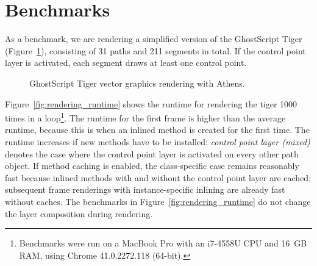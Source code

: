 \documentclass{sig-alternate}
\begin{document}
\section{Benchmarks}
\label{sec:bench}
As a benchmark, we are rendering a simplified version of the GhostScript Tiger (Figure~\ref{fig:gs_tiger}), consisting of 31 paths and 211 segments in total. If the control point layer is activated, each segment draws at least one control point.

\begin{figure}[t]
        \centering
        \hfill
    \caption{GhostScript Tiger vector graphics rendering with Athens.}
    \label{fig:gs_tiger}
\end{figure}

Figure~\ref{fig:rendering_runtime} shows the runtime for rendering the tiger 1000 times in a loop\footnote{Benchmarks were run on a MacBook Pro with an i7-4558U CPU and 16~GB RAM, using Chrome 41.0.2272.118 (64-bit).}. The runtime for the first frame is higher than the average runtime, because this is when an inlined method is created for the first time. The runtime increases if new methods have to be installed: \emph{control point layer (mixed)} denotes the case where the control point layer is activated on every other path object. If method caching is enabled, the class-specific case remains reasonably fast because inlined methods with and without the control point layer are cached; subsequent frame renderings with instance-specific inlining are already fast without caches. The benchmarks in Figure~\ref{fig:rendering_runtime} do not change the layer composition during rendering. 
\end{document}
